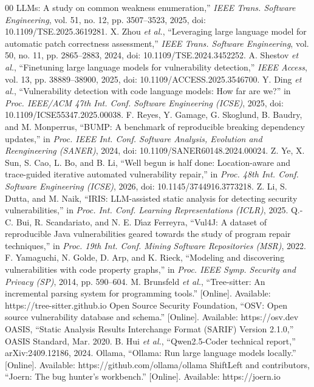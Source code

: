 \documentclass[conference]{IEEEtran}
\begin{document}
\begin{thebibliography}{00}
LLMs: A study on common weakness enumeration,'' \textit{IEEE Trans. Software
Engineering}, vol. 51, no. 12, pp. 3507--3523, 2025, doi: 10.1109/TSE.2025.3619281.
 X. Zhou \textit{et al.}, ``Leveraging large language model
for automatic patch correctness assessment,'' \textit{IEEE Trans. Software Engineering},
vol. 50, no. 11, pp. 2865--2883, 2024, doi: 10.1109/TSE.2024.3452252.
 A. Shestov \textit{et al.}, ``Finetuning large language
models for vulnerability detection,'' \textit{IEEE Access}, vol. 13, pp. 38889--38900,
2025, doi: 10.1109/ACCESS.2025.3546700.
 Y. Ding \textit{et al.}, ``Vulnerability detection with code
language models: How far are we?'' in \textit{Proc. IEEE/ACM 47th Int. Conf. Software
Engineering (ICSE)}, 2025, doi: 10.1109/ICSE55347.2025.00038.
 F. Reyes, Y. Gamage, G. Skoglund, B. Baudry, and M. Monperrus,
``BUMP: A benchmark of reproducible breaking dependency updates,'' in \textit{Proc. IEEE
Int. Conf. Software Analysis, Evolution and Reengineering (SANER)}, 2024, doi:
10.1109/SANER60148.2024.00024.
 Z. Ye, X. Sun, S. Cao, L. Bo, and B. Li, ``Well begun is half
done: Location-aware and trace-guided iterative automated vulnerability repair,'' in
\textit{Proc. 48th Int. Conf. Software Engineering (ICSE)}, 2026, doi:
10.1145/3744916.3773218.
 Z. Li, S. Dutta, and M. Naik, ``IRIS: LLM-assisted static analysis
for detecting security vulnerabilities,'' in \textit{Proc. Int. Conf. Learning
Representations (ICLR)}, 2025.
 Q.-C. Bui, R. Scandariato, and N. E. D\'{\i}az Ferreyra, ``Vul4J: A
dataset of reproducible Java vulnerabilities geared towards the study of program repair
techniques,'' in \textit{Proc. 19th Int. Conf. Mining Software Repositories (MSR)}, 2022.
 F. Yamaguchi, N. Golde, D. Arp, and K. Rieck, ``Modeling and
discovering vulnerabilities with code property graphs,'' in \textit{Proc. IEEE Symp.
Security and Privacy (SP)}, 2014, pp. 590--604.
 M. Brunsfeld \textit{et al.}, ``Tree-sitter: An incremental parsing
system for programming tools.'' [Online]. Available: https://tree-sitter.github.io
 Open Source Security Foundation, ``OSV: Open source vulnerability database
and schema.'' [Online]. Available: https://osv.dev
 OASIS, ``Static Analysis Results Interchange Format (SARIF) Version
2.1.0,'' OASIS Standard, Mar. 2020.
 B. Hui \textit{et al.}, ``Qwen2.5-Coder technical report,''
arXiv:2409.12186, 2024.
 Ollama, ``Ollama: Run large language models locally.'' [Online].
Available: https://github.com/ollama/ollama
 ShiftLeft and contributors, ``Joern: The bug hunter's workbench.''
[Online]. Available: https://joern.io
\end{thebibliography}
\end{document}
